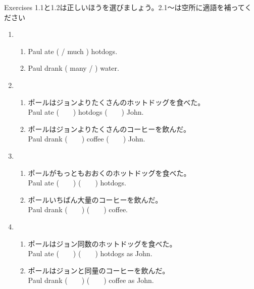 \documentclass[aspectratio=169,xcolor={dvipsnames,table}]{beamer}
\begin{document}
\begin{frame}[plain]{Exercises}
1.1と1.2は正しいほうを選びましょう。2.1～は空所に適語を補ってください
 \begin{enumerate}
  \item \begin{enumerate}
	 \item<1-> Paul ate (  / much ) hotdogs.
	 \item<1-> Paul drank ( many / ) water.
	\end{enumerate}
  \item \begin{enumerate}
	 \item<1-> ポールはジョンよりたくさんのホットドッグを食べた。\\
	       Paul ate (~~~~) hotdogs (~~~~) John.
	 \item<1-> ポールはジョンよりたくさんのコーヒーを飲んだ。\\
	       Paul drank (~~~~) coffee (~~~~) John.
	\end{enumerate}
  \item \begin{enumerate}
	 \item<1-> ポールがもっともおおくのホットドッグを食べた。\\
	       Paul ate (~~~~) (~~~~) hotdogs.
	 \item<1-> ポールいちばん大量のコーヒーを飲んだ。\\
	       Paul drank (~~~~) (~~~~) coffee.
	\end{enumerate}
  \item \begin{enumerate}
	 \item<1-> ポールはジョン同数のホットドッグを食べた。\\
	       Paul ate (~~~~) (~~~~) hotdogs as John.
	 \item<1-> ポールはジョンと同量のコーヒーを飲んだ。\\
	       Paul drank (~~~~) (~~~~) coffee as John.
	\end{enumerate}
 \end{enumerate}
\end{frame}
\end{document}

